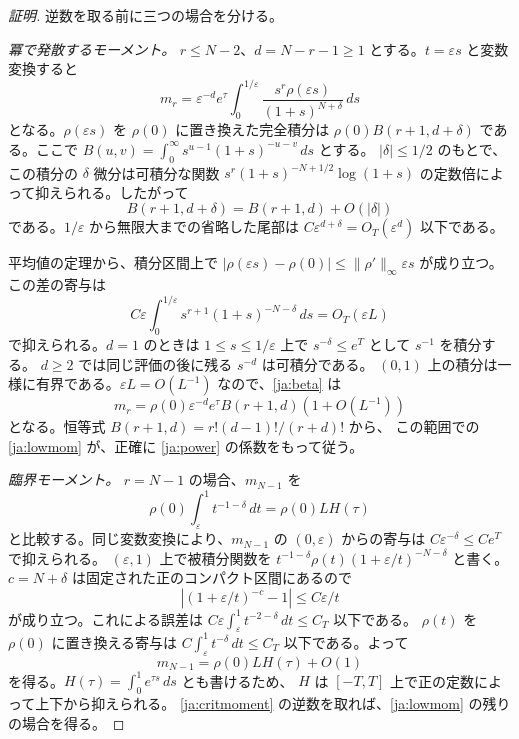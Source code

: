 \documentclass[12pt]{amsart}
\theoremstyle{definition}
\theoremstyle{remark}
\numberwithin{equation}{section}
\theoremstyle{definition}
\begin{document}
\begin{proof}[証明]
逆数を取る前に三つの場合を分ける。

\emph{冪で発散するモーメント。}
$r\le N-2$、$d=N-r-1\ge1$ とする。$t=\varepsilon s$ と変数変換すると
\begin{equation}\label{ja:beta}
 m_r=\varepsilon^{-d}e^\tau
 \int_0^{1/\varepsilon}
 \frac{s^r\rho(\varepsilon s)}{(1+s)^{N+\delta}}\,ds
\end{equation}
となる。$\rho(\varepsilon s)$ を $\rho(0)$ に置き換えた完全積分は
$\rho(0)B(r+1,d+\delta)$ である。ここで
$B(u,v)=\int_0^\infty s^{u-1}(1+s)^{-u-v}\,ds$ とする。
$|\delta|\le1/2$ のもとで、この積分の $\delta$ 微分は可積分な関数
$s^r(1+s)^{-N+1/2}\log(1+s)$ の定数倍によって抑えられる。したがって
\[
 B(r+1,d+\delta)=B(r+1,d)+O(|\delta|)
\]
である。$1/\varepsilon$ から無限大までの省略した尾部は
$C\varepsilon^{d+\delta}=O_T(\varepsilon^d)$ 以下である。

平均値の定理から、積分区間上で
$|\rho(\varepsilon s)-\rho(0)|\le\|\rho'\|_\infty\varepsilon s$ が成り立つ。
この差の寄与は
\[
 C\varepsilon\int_0^{1/\varepsilon}
 s^{r+1}(1+s)^{-N-\delta}\,ds=O_T(\varepsilon L)
\]
で抑えられる。$d=1$ のときは $1\le s\le1/\varepsilon$ 上で
$s^{-\delta}\le e^T$ として $s^{-1}$ を積分する。
$d\ge2$ では同じ評価の後に残る $s^{-d}$ は可積分である。
$(0,1)$ 上の積分は一様に有界である。$\varepsilon L=O(L^{-1})$ なので、\eqref{ja:beta} は
\[
 m_r=\rho(0)\varepsilon^{-d}e^\tau
 B(r+1,d)(1+O(L^{-1}))
\]
となる。恒等式 $B(r+1,d)=r!(d-1)!/(r+d)!$ から、
この範囲での \eqref{ja:lowmom} が、正確に \eqref{ja:power} の係数をもって従う。

\emph{臨界モーメント。}
$r=N-1$ の場合、$m_{N-1}$ を
\begin{equation}\label{ja:criticalintegral}
 \rho(0)\int_\varepsilon^1t^{-1-\delta}\,dt
 =\rho(0)LH(\tau)
\end{equation}
と比較する。同じ変数変換により、$m_{N-1}$ の $(0,\varepsilon)$ からの寄与は
$C\varepsilon^{-\delta}\le Ce^T$ で抑えられる。
$(\varepsilon,1)$ 上で被積分関数を
$t^{-1-\delta}\rho(t)(1+\varepsilon/t)^{-N-\delta}$ と書く。
$c=N+\delta$ は固定された正のコンパクト区間にあるので
\[
 |(1+\varepsilon/t)^{-c}-1|\le C\varepsilon/t
\]
が成り立つ。これによる誤差は
$C\varepsilon\int_\varepsilon^1t^{-2-\delta}\,dt\le C_T$ 以下である。
$\rho(t)$ を $\rho(0)$ に置き換える寄与は
$C\int_\varepsilon^1t^{-\delta}\,dt\le C_T$ 以下である。よって
\begin{equation}\label{ja:critmoment}
 m_{N-1}=\rho(0)LH(\tau)+O(1)
\end{equation}
を得る。$H(\tau)=\int_0^1e^{\tau s}\,ds$ とも書けるため、
$H$ は $[-T,T]$ 上で正の定数によって上下から抑えられる。
\eqref{ja:critmoment} の逆数を取れば、\eqref{ja:lowmom} の残りの場合を得る。


\end{proof}
\end{document}
